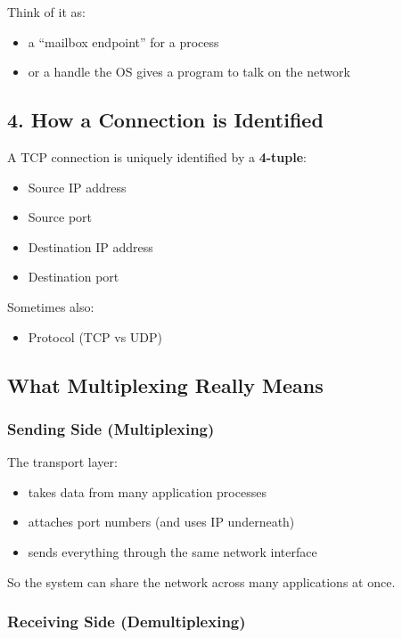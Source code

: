 Think of it as:
\begin{itemize}
    \item a “mailbox endpoint” for a process
    \item or a handle the OS gives a program to talk on the network
\end{itemize}

\subsection{4. How a Connection is Identified}

A TCP connection is uniquely identified by a \textbf{4-tuple}:

\begin{itemize}
    \item Source IP address
    \item Source port
    \item Destination IP address
    \item Destination port
\end{itemize}

Sometimes also:
\begin{itemize}
    \item Protocol (TCP vs UDP)
\end{itemize}

\subsection{What Multiplexing Really Means}

\subsubsection{Sending Side (Multiplexing)}

The transport layer:
\begin{itemize}
    \item takes data from many application processes
    \item attaches port numbers (and uses IP underneath)
    \item sends everything through the same network interface
\end{itemize}

So the system can share the network across many applications at once.

\subsubsection{Receiving Side (Demultiplexing)}

